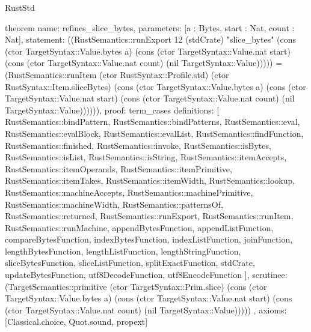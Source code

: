 \begin{lexlean}{RustStd}
\begin{semanticmodule}
theorem{
  name: refines_slice_bytes,
  parameters: [a : Bytes, start : Nat, count : Nat],
  statement: ((RustSemantics::runExport 12 (stdCrate) "slice_bytes" (cons (ctor TargetSyntax::Value.bytes a) (cons (ctor TargetSyntax::Value.nat start) (cons (ctor TargetSyntax::Value.nat count) (nil TargetSyntax::Value))))) = (RustSemantics::runItem (ctor RustSyntax::Profile.std) (ctor RustSyntax::Item.sliceBytes) (cons (ctor TargetSyntax::Value.bytes a) (cons (ctor TargetSyntax::Value.nat start) (cons (ctor TargetSyntax::Value.nat count) (nil TargetSyntax::Value)))))),
  proof: term_cases{
    definitions: [
      RustSemantics::bindPattern,
      RustSemantics::bindPatterns,
      RustSemantics::eval,
      RustSemantics::evalBlock,
      RustSemantics::evalList,
      RustSemantics::findFunction,
      RustSemantics::finished,
      RustSemantics::invoke,
      RustSemantics::isBytes,
      RustSemantics::isList,
      RustSemantics::isString,
      RustSemantics::itemAccepts,
      RustSemantics::itemOperands,
      RustSemantics::itemPrimitive,
      RustSemantics::itemTakes,
      RustSemantics::itemWidth,
      RustSemantics::lookup,
      RustSemantics::machineAccepts,
      RustSemantics::machinePrimitive,
      RustSemantics::machineWidth,
      RustSemantics::patternsOf,
      RustSemantics::returned,
      RustSemantics::runExport,
      RustSemantics::runItem,
      RustSemantics::runMachine,
      appendBytesFunction,
      appendListFunction,
      compareBytesFunction,
      indexBytesFunction,
      indexListFunction,
      joinFunction,
      lengthBytesFunction,
      lengthListFunction,
      lengthStringFunction,
      sliceBytesFunction,
      sliceListFunction,
      splitExactFunction,
      stdCrate,
      updateBytesFunction,
      utf8DecodeFunction,
      utf8EncodeFunction
    ],
    scrutinee: (TargetSemantics::primitive (ctor TargetSyntax::Prim.slice) (cons (ctor TargetSyntax::Value.bytes a) (cons (ctor TargetSyntax::Value.nat start) (cons (ctor TargetSyntax::Value.nat count) (nil TargetSyntax::Value)))))
  },
  axioms: [Classical.choice, Quot.sound, propext]
}


\end{semanticmodule}
\end{lexlean}

